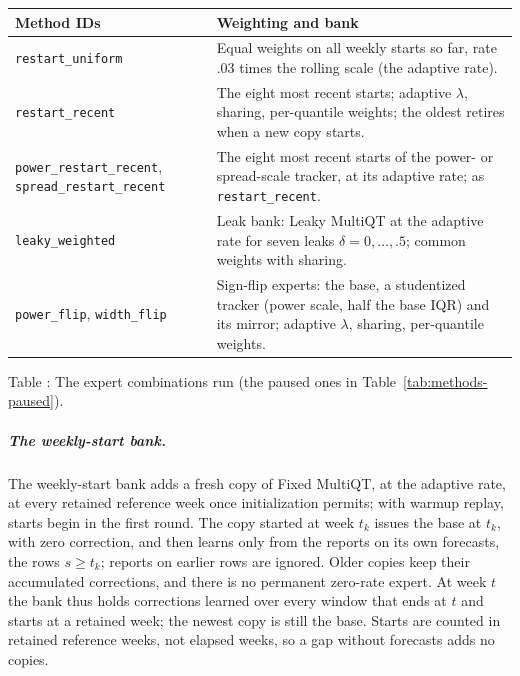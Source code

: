 \documentclass[11pt,a4paper]{article}
\theoremstyle{definition}
\theoremstyle{remark}
\begin{document}
\begin{center}\small
\renewcommand{\arraystretch}{1.2}
\begin{tabularx}{\textwidth}{@{}>{\raggedright\arraybackslash}p{}X@{}}
\toprule
Method IDs & Weighting and bank\\
\midrule
\texttt{restart\_uniform} & Equal weights on all weekly starts so far, rate $.03$ times the rolling scale (the adaptive rate).\\
\texttt{restart\_recent} & The eight most recent starts; adaptive $\lambda$, sharing, per-quantile weights; the oldest retires when a new copy starts.\\
\texttt{power\_restart\_recent}, \texttt{spread\_restart\_recent} & The eight most recent starts of the power- or spread-scale tracker, at its adaptive rate; as \texttt{restart\_recent}.\\
\texttt{leaky\_weighted} & Leak bank: Leaky MultiQT at the adaptive rate for seven leaks $\delta=0,\ldots,.5$; common weights with sharing.\\
\texttt{power\_flip}, \texttt{width\_flip} & Sign-flip experts: the base, a studentized tracker (power scale, half the base IQR) and its mirror; adaptive $\lambda$, sharing, per-quantile weights.\\
\bottomrule
\end{tabularx}
\end{center}
\label{tab:expert-combinations}
\begin{center}\small Table \thetable: The expert combinations run (the paused
ones in Table~\ref{tab:methods-paused}).
\end{center}

\subparagraph{The weekly-start bank.}
The weekly-start bank adds a fresh copy of Fixed MultiQT, at the adaptive
rate, at every retained reference week once initialization permits;
with warmup replay, starts begin in the first round. The copy started at
week $t_k$ issues the base at $t_k$, with zero correction, and then
learns only from the reports on its own forecasts, the rows $s\ge t_k$;
reports on earlier rows are ignored. Older copies keep their accumulated
corrections, and there is no permanent zero-rate expert. At week $t$ the
bank thus holds corrections learned over every window that ends at $t$
and starts at a retained week; the newest copy is still the base.
Starts are counted in retained reference weeks, not elapsed weeks, so a
gap without forecasts adds no copies.
\end{document}
